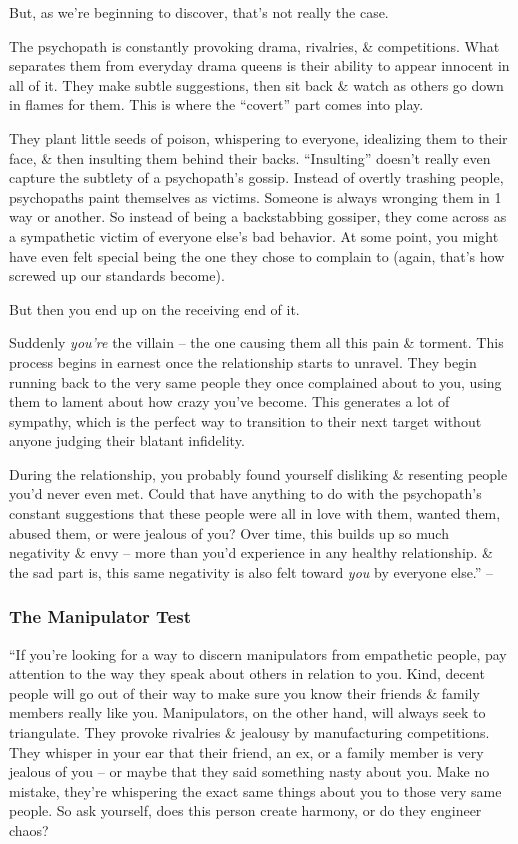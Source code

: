\documentclass{article}
\numberwithin{equation}{section}
\begin{document}
But, as we're beginning to discover, that's not really the case.

The psychopath is constantly provoking drama, rivalries, \& competitions. What separates them from everyday drama queens is their ability to appear innocent in all of it. They make subtle suggestions, then sit back \& watch as others go down in flames for them. This is where the ``covert'' part comes into play.

They plant little seeds of poison, whispering to everyone, idealizing them to their face, \& then insulting them behind their backs. ``Insulting'' doesn't really even capture the subtlety of a psychopath's gossip. Instead of overtly trashing people, psychopaths paint themselves as victims. Someone is always wronging them in 1 way or another. So instead of being a backstabbing gossiper, they come across as a sympathetic victim of everyone else's bad behavior. At some point, you might have even felt special being the one they chose to complain to (again, that's how screwed up our standards become).

But then you end up on the receiving end of it.

Suddenly \textit{you're} the villain -- the one causing them all this pain \& torment. This process begins in earnest once the relationship starts to unravel. They begin running back to the very same people they once complained about to you, using them to lament about how crazy you've become. This generates a lot of sympathy, which is the perfect way to transition to their next target without anyone judging their blatant infidelity.

During the relationship, you probably found yourself disliking \& resenting people you'd never even met. Could that have anything to do with the psychopath's constant suggestions that these people were all in love with them, wanted them, abused them, or were jealous of you? Over time, this builds up so much negativity \& envy -- more than you'd experience in any healthy relationship. \& the sad part is, this same negativity is also felt toward \textit{you} by everyone else.'' -- \cite[pp. 57--58]{MacKenzie2015}

\subsubsection{The Manipulator Test}
``If you're looking for a way to discern manipulators from empathetic people, pay attention to the way they speak about others in relation to you. Kind, decent people will go out of their way to make sure you know their friends \& family members really like you. Manipulators, on the other hand, will always seek to triangulate. They provoke rivalries \& jealousy by manufacturing competitions. They whisper in your ear that their friend, an ex, or a family member is very jealous of you -- or maybe that they said something nasty about you. Make no mistake, they're whispering the exact same things about you to those very same people. So ask yourself, does this person create harmony, or do they engineer chaos?
\end{document}
